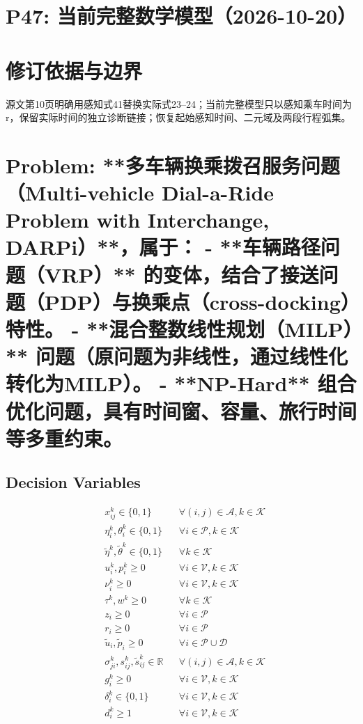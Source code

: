 \documentclass[11pt]{ctexart}
\begin{document}
\section*{P47: 当前完整数学模型（2026-10-20）}
\section*{修订依据与边界}源文第10页明确用感知式41替换实际式23–24；当前完整模型只以感知乘车时间为r，保留实际时间的独立诊断链接；恢复起始感知时间、二元域及两段行程弧集。


\section*{Problem: **多车辆换乘拨召服务问题（Multi-vehicle Dial-a-Ride Problem with Interchange, DARPi）**，属于：  
- **车辆路径问题（VRP）** 的变体，结合了接送问题（PDP）与换乘点（cross-docking）特性。  
- **混合整数线性规划（MILP）** 问题（原问题为非线性，通过线性化转化为MILP）。  
- **NP-Hard** 组合优化问题，具有时间窗、容量、旅行时间等多重约束。}



\subsection*{Decision Variables}
\begin{align*}
& x_{ij}^k \in \{0, 1\} && \forall (i,j) \in \mathcal{A}, k \in \mathcal{K} \\
& \eta_i^k, \theta_i^k \in \{0, 1\} && \forall i \in \mathcal{P}, k \in \mathcal{K} \\
& \tilde{\eta}^k, \tilde{\theta}^k \in \{0,1\} && \forall k \in \mathcal{K} \\
& u_i^k, p_i^k \ge 0 && \forall i \in \mathcal{V}, k \in \mathcal{K} \\
& \nu_i^k \ge 0 && \forall i \in \mathcal{V}, k \in \mathcal{K} \\
& \tau^k, w^k \ge 0 && \forall k \in \mathcal{K} \\
& z_i \ge 0 && \forall i \in \mathcal{P} \\
& r_i \ge 0 && \forall i \in \mathcal{P} \\
& \tilde{u}_i, \tilde{p}_i \ge 0 && \forall i \in \mathcal{P} \cup \mathcal{D} \\
& \sigma_{ji}^k, s_{ij}^k, \tilde{s}_{ij}^k \in \mathbb{R} && \forall (i,j) \in \mathcal{A}, k \in \mathcal{K} \\
& g_i^k \ge 0 && \forall i \in \mathcal{V}, k \in \mathcal{K} \\
& \delta_i^k \in \{0, 1\} && \forall i \in \mathcal{V}, k \in \mathcal{K} \\
& d_i^k \ge 1 && \forall i \in \mathcal{V}, k \in \mathcal{K}
\end{align*}
\end{document}
